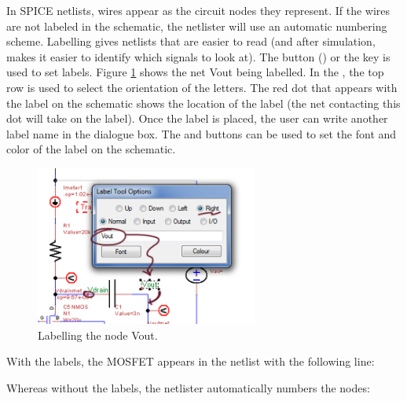  In SPICE netlists, wires appear as the circuit nodes they represent.  If the wires are not labeled in the schematic, the netlister will use an automatic numbering scheme.  Labelling gives netlists that are easier to read (and after simulation, makes it easier to identify which signals to look at).  The  button () or the  key is used to set labels.  Figure \ref{fig_schematiceditor_labelexample} shows the net \textsf{Vout} being labelled.  In the , the top row is used to select the orientation of the letters.  The red dot that appears with the label on the schematic shows the location of the label (the net contacting this dot will take on the label).  Once the label is placed, the user can write another label name in the dialogue box.  The  and  buttons can be used to set the font and color of the label on the schematic.

\begin{figure}
    \includegraphics[width=0.65\textwidth]{./figures/schematic_editor_figures/SchematicEditor_LabelOptionsDialogue.png}
    \caption{{Labelling the node \textsf{Vout}.}}
  \label{fig_schematiceditor_labelexample}
\end{figure}

With the labels, the MOSFET appears in the netlist with the following line:


Whereas without the labels, the netlister automatically numbers the nodes:


